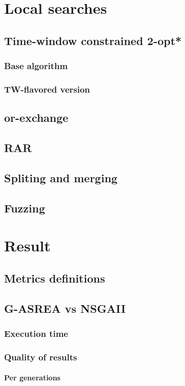 \documentclass[french, 11pt]{memoir}
\begin{document}
\section{Local searches}
\subsection{Time-window constrained 2-opt*}
\subsubsection{Base algorithm}
\subsubsection{TW-flavored version}
\subsection{or-exchange}
\subsection{RAR}
\subsection{Spliting and merging}
\subsection{Fuzzing}

\section{Result}
\subsection{Metrics definitions}

\subsection{G-ASREA vs NSGAII}
\subsubsection{Execution time}
\subsubsection{Quality of results}

\paragraph{Per generations}
\end{document}
